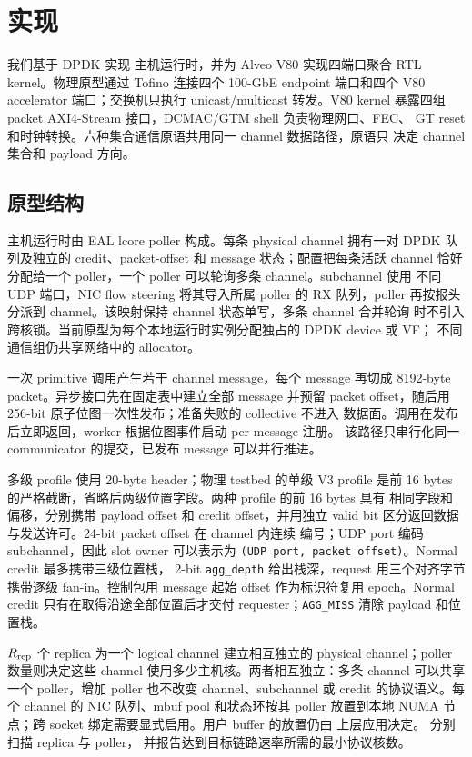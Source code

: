 \chapter{实现}
\label{chap:implementation}

我们基于 DPDK 实现 \sysname 主机运行时，并为 Alveo V80 实现四端口聚合
RTL kernel。物理原型通过 Tofino 连接四个 100-GbE endpoint 端口和四个
V80 accelerator 端口；交换机只执行 unicast/multicast 转发。V80 kernel
暴露四组 packet AXI4-Stream 接口，DCMAC/GTM shell 负责物理网口、FEC、
GT reset 和时钟转换。六种集合通信原语共用同一 channel 数据路径，原语只
决定 channel 集合和 payload 方向。

\section{原型结构}
\label{sec:impl-structure}

主机运行时由 EAL lcore poller 构成。每条 physical channel 拥有一对 DPDK
队列及独立的 credit、packet-offset 和 message 状态；配置把每条活跃 channel
恰好分配给一个 poller，一个 poller 可以轮询多条 channel。subchannel 使用
不同 UDP 端口，NIC flow steering 将其导入所属 poller 的 RX 队列，poller
再按报头分派到 channel。该映射保持 channel 状态单写，多条 channel 合并轮询
时不引入跨核锁。当前原型为每个本地运行时实例分配独占的 DPDK device 或 VF；
不同通信组仍共享网络中的 allocator。

一次 primitive 调用产生若干 channel message，每个 message 再切成
8192-byte packet。异步接口先在固定表中建立全部 message 并预留 packet
offset，随后用 256-bit 原子位图一次性发布；准备失败的 collective 不进入
数据面。调用在发布后立即返回，worker 根据位图事件启动 per-message 注册。
该路径只串行化同一 communicator 的提交，已发布 message 可以并行推进。

多级 profile 使用 20-byte header；物理 testbed 的单级 V3 profile 是前
16 bytes 的严格截断，省略后两级位置字段。两种 profile 的前 16 bytes 具有
相同字段和偏移，分别携带 payload offset 和 credit offset，并用独立
valid bit 区分返回数据与发送许可。24-bit packet offset 在 channel 内连续
编号；UDP port 编码 subchannel，因此 slot owner 可以表示为
\texttt{(UDP port, packet offset)}。Normal credit 最多携带三级位置栈，
2-bit \texttt{agg\_depth} 给出栈深，request 用三个对齐字节携带逐级
fan-in。控制包用 message 起始 offset 作为标识符复用 epoch。Normal
credit 只有在取得沿途全部位置后才交付 requester；\texttt{AGG\_MISS}
清除 payload 和位置栈。

$R_{\rm rep}$ 个 replica 为一个 logical channel 建立相互独立的 physical
channel；poller 数量则决定这些 channel 使用多少主机核。两者相互独立：多条
channel 可以共享一个 poller，增加 poller 也不改变 channel、subchannel 或
credit 的协议语义。每个 channel 的 NIC 队列、mbuf pool 和状态环按其 poller
放置到本地 NUMA 节点；跨 socket 绑定需要显式启用。用户 buffer 的放置仍由
上层应用决定。 分别扫描 replica 与 poller，
并报告达到目标链路速率所需的最小协议核数。

